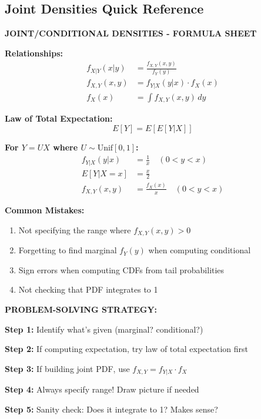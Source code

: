 \documentclass[10pt,letterpaper]{article}
\begin{document}
\subsection{Joint Densities Quick Reference}

\begin{formulabox}
\textbf{JOINT/CONDITIONAL DENSITIES - FORMULA SHEET}

\vspace{0.2cm}

\textbf{Relationships:}
\begin{align*}
f_{X|Y}(x|y) &= \frac{f_{X,Y}(x,y)}{f_Y(y)} \\
f_{X,Y}(x,y) &= f_{Y|X}(y|x) \cdot f_X(x) \\
f_X(x) &= \int f_{X,Y}(x,y) \, dy
\end{align*}

\textbf{Law of Total Expectation:}
\[
E[Y] = E[E[Y|X]]
\]

\textbf{For $Y = UX$ where $U \sim \text{Unif}[0,1]$:}
\begin{align*}
f_{Y|X}(y|x) &= \frac{1}{x} \quad (0 < y < x) \\
E[Y|X=x] &= \frac{x}{2} \\
f_{X,Y}(x,y) &= \frac{f_X(x)}{x} \quad (0 < y < x)
\end{align*}
\end{formulabox}

\begin{warningbox}
\textbf{Common Mistakes:}
\begin{enumerate}
  \item Not specifying the range where $f_{X,Y}(x,y) > 0$
  \item Forgetting to find marginal $f_Y(y)$ when computing conditional
  \item Sign errors when computing CDFs from tail probabilities
  \item Not checking that PDF integrates to 1
\end{enumerate}
\end{warningbox}

\begin{strategybox}
\textbf{PROBLEM-SOLVING STRATEGY:}

\textbf{Step 1:} Identify what's given (marginal? conditional?)

\textbf{Step 2:} If computing expectation, try law of total expectation first

\textbf{Step 3:} If building joint PDF, use $f_{X,Y} = f_{Y|X} \cdot f_X$

\textbf{Step 4:} Always specify range! Draw picture if needed

\textbf{Step 5:} Sanity check: Does it integrate to 1? Makes sense?
\end{strategybox}
\end{document}
